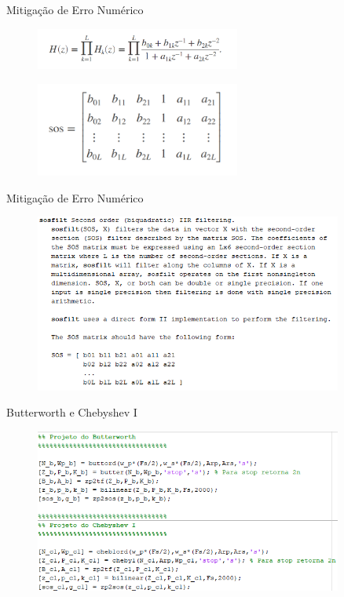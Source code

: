 \begin{frame}{Mitigação de Erro Numérico}
    \begin{figure}[!htb]
    \includegraphics[width=0.6\textwidth]{graficos/eq_sos.PNG}
    \end{figure} 
	\begin{figure}[!htb]
    \includegraphics[width=0.6\textwidth]{graficos/matriz_sos.PNG}
    \end{figure} 
\end{frame}

\begin{frame}{Mitigação de Erro Numérico}
    \begin{figure}[!htb]
    \includegraphics[width=0.9\textwidth]{graficos/sos_filt_doc.png}
    \end{figure}
    
\end{frame}

\begin{frame}{Butterworth e Chebyshev I}
    \begin{figure}[!htb]
    \includegraphics[width=0.9\textwidth]{graficos/code_butt_chebI.PNG}
    \end{figure} 
\end{frame}


